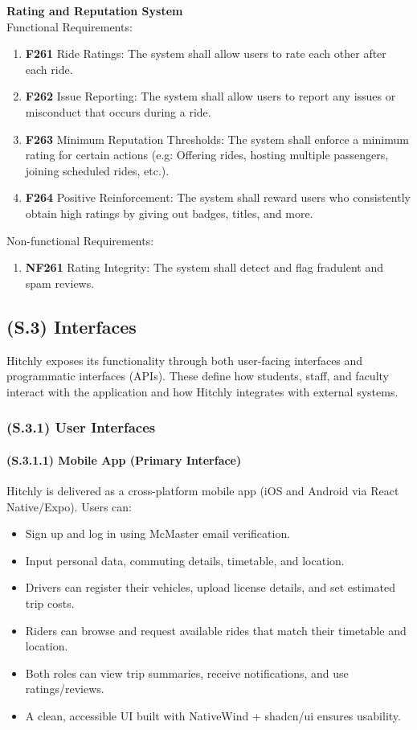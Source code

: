 \documentclass[12pt,letterpaper]{article}
\begin{document}
\noindent \textbf{Rating and Reputation System} \\
Functional Requirements:
\begin{enumerate}
  \item \textbf{F261} Ride Ratings: The system shall allow users to rate each other after each ride.
  \item \textbf{F262} Issue Reporting: The system shall allow users to report any issues or misconduct that occurs during a ride.
  \item \textbf{F263} Minimum Reputation Thresholds: The system shall enforce a minimum rating for certain actions (e.g: Offering rides, hosting multiple passengers, joining scheduled rides, etc.).
  \item \textbf{F264} Positive Reinforcement: The system shall reward users who consistently obtain high ratings by giving out badges, titles, and more.
\end{enumerate}
Non-functional Requirements:
\begin{enumerate}
  \item \textbf{NF261} Rating Integrity: The system shall detect and flag fradulent and spam reviews. 
\end{enumerate}


\subsection{(S.3) Interfaces} %

Hitchly exposes its functionality through both user-facing interfaces and programmatic interfaces (APIs). These define how students, staff, and faculty interact with the application and how Hitchly integrates with external systems.

\subsubsection{(S.3.1) User Interfaces} %

\paragraph{(S.3.1.1) Mobile App (Primary Interface)} %
Hitchly is delivered as a cross-platform mobile app (iOS and Android via React Native/Expo). Users can:

\begin{itemize}
    \item Sign up and log in using McMaster email verification.
    \item Input personal data, commuting details, timetable, and location.
    \item Drivers can register their vehicles, upload license details, and set estimated trip costs.
    \item Riders can browse and request available rides that match their timetable and location.
    \item Both roles can view trip summaries, receive notifications, and use ratings/reviews.
    \item A clean, accessible UI built with NativeWind + shadcn/ui ensures usability.
\end{itemize}
\end{document}
